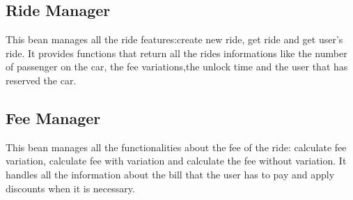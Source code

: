 \subsection{Ride Manager}
This bean manages all the ride features:create new ride, get ride and get user's ride.
It provides functions that return all the rides informations like the number of passenger on the car, the fee variations,the unlock time and the user that has reserved the car.

\subsection{Fee Manager}
This bean manages all the functionalities about the fee of the ride: calculate fee variation, calculate fee with variation and calculate the fee without variation.
It handles all the information about the bill that the user has to pay and apply discounts when it is necessary.
